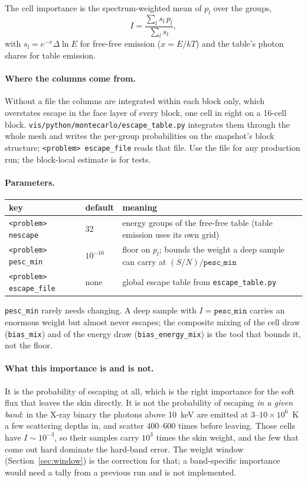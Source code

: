 \documentclass[11pt]{article}
\newcommand{\key}[1]{\texttt{#1}}
\begin{document}
The cell importance is the spectrum-weighted mean of $p_l$ over the groups,
\begin{equation}
  I = \frac{\sum_l s_l\, p_l}{\sum_l s_l},
\end{equation}
with $s_l = e^{-x}\Delta\ln E$ for free-free emission ($x = E/kT$) and the table's photon
shares for table emission.

\paragraph{Where the columns come from.} Without a file the columns are integrated within
each block only, which overstates escape in the face layer of every block, one cell in
eight on a 16-cell block. \key{vis/python/montecarlo/escape\_table.py} integrates them
through the whole mesh and writes the per-group probabilities on the snapshot's block
structure; \key{<problem> escape\_file} reads that file. Use the file for any production
run; the block-local estimate is for tests.

\paragraph{Parameters.}
\begin{center}
\begin{tabular}{@{}llp{3.1in}@{}}
\toprule
key & default & meaning \\
\midrule
\key{<problem> nescape} & 32 & energy groups of the free-free table (table emission uses its own grid) \\
\key{<problem> pesc\_min} & $10^{-10}$ & floor on $p_l$; bounds the weight a deep sample can carry at $(S/N)/\key{pesc\_min}$ \\
\key{<problem> escape\_file} & none & global escape table from \key{escape\_table.py} \\
\bottomrule
\end{tabular}
\end{center}
\key{pesc\_min} rarely needs changing. A deep sample with $I = \key{pesc\_min}$ carries
an enormous weight but almost never escapes; the composite mixing of the cell draw
(\key{bias\_mix}) and of the energy draw (\key{bias\_energy\_mix}) is the tool that
bounds it, not the floor.

\paragraph{What this importance is and is not.} It is the probability of escaping at all,
which is the right importance for the soft flux that leaves the skin directly. It is not
the probability of escaping \emph{in a given band}: in the X-ray binary the photons above
10~keV are emitted at $3$--$10\times10^6$~K a few scattering depths in, and scatter
400--600 times before leaving. Those cells have $I \sim 10^{-3}$, so their samples carry
$10^3$ times the skin weight, and the few that come out hard dominate the hard-band error.
The weight window (Section~\ref{sec:window}) is the correction for that; a
band-specific importance would need a tally from a previous run and is not implemented.
\end{document}
